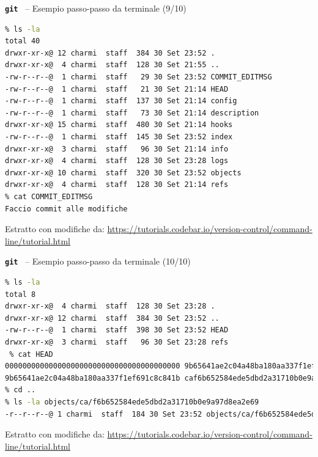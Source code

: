 \documentclass{beamer}
\newcommand{\git}{\texttt{\textbf{git}}\xspace}
\begin{document}
\begin{frame}[fragile]{\centerline{\git ~ -- Esempio passo-passo da terminale (9/10)}}
\begin{lstlisting}[language=sh]
% cd .git
% ls -la
total 40
drwxr-xr-x@ 12 charmi  staff  384 30 Set 23:52 .
drwxr-xr-x@  4 charmi  staff  128 30 Set 21:55 ..
-rw-r--r--@  1 charmi  staff   29 30 Set 23:52 COMMIT_EDITMSG
-rw-r--r--@  1 charmi  staff   21 30 Set 21:14 HEAD
-rw-r--r--@  1 charmi  staff  137 30 Set 21:14 config
-rw-r--r--@  1 charmi  staff   73 30 Set 21:14 description
drwxr-xr-x@ 15 charmi  staff  480 30 Set 21:14 hooks
-rw-r--r--@  1 charmi  staff  145 30 Set 23:52 index
drwxr-xr-x@  3 charmi  staff   96 30 Set 21:14 info
drwxr-xr-x@  4 charmi  staff  128 30 Set 23:28 logs
drwxr-xr-x@ 10 charmi  staff  320 30 Set 23:52 objects
drwxr-xr-x@  4 charmi  staff  128 30 Set 21:14 refs
% cat COMMIT_EDITMSG 
Faccio commit alle modifiche
\end{lstlisting}

\begin{center}
    \tiny Estratto con modifiche da: \url{https://tutorials.codebar.io/version-control/command-line/tutorial.html}
\end{center}
\end{frame}

\begin{frame}[fragile]{\centerline{\git ~ -- Esempio passo-passo da terminale (10/10)}}
\begin{lstlisting}[language=sh]
% cd logs
% ls -la
total 8
drwxr-xr-x@  4 charmi  staff  128 30 Set 23:28 .
drwxr-xr-x@ 12 charmi  staff  384 30 Set 23:52 ..
-rw-r--r--@  1 charmi  staff  398 30 Set 23:52 HEAD
drwxr-xr-x@  3 charmi  staff   96 30 Set 23:28 refs
 % cat HEAD 
0000000000000000000000000000000000000000 9b65641ae2c04a48ba180aa337f1ef691c8c841b GiancarloSucci <GiancarloSucci@users.noreply.github.com> 1696109303 +0200	commit (initial): Faccio commit di primoFile.txt
9b65641ae2c04a48ba180aa337f1ef691c8c841b caf6b652584ede5dbd2a31710b0e9a97d8ea2e69 GiancarloSucci <GiancarloSucci@users.noreply.github.com> 1696110778 +0200	commit: Faccio commit alle modifiche
% cd ..
% ls -la objects/ca/f6b652584ede5dbd2a31710b0e9a97d8ea2e69
-r--r--r--@ 1 charmi  staff  184 30 Set 23:52 objects/ca/f6b652584ede5dbd2a31710b0e9a97d8ea2e69
\end{lstlisting}
\begin{center}
    \tiny Estratto con modifiche da: \url{https://tutorials.codebar.io/version-control/command-line/tutorial.html}
\end{center}
\end{frame}
\end{document}
